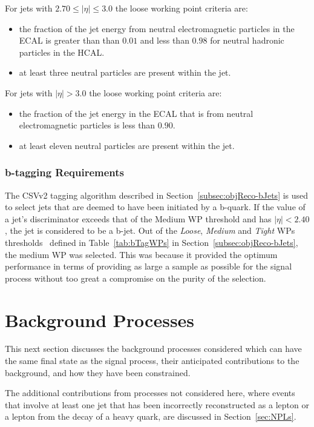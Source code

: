 For jets with $ 2.70 \leq |\eta| \leq 3.0$ the loose working point criteria are:
\begin{itemize}
\item the fraction of the jet energy from neutral electromagnetic particles in the ECAL is greater than than $0.01$ and less than $0.98$ for neutral hadronic particles in the HCAL.
\item at least three neutral particles are present within the jet.
\end{itemize}

For jets with $|\eta| > 3.0$ the loose working point criteria are:
\begin{itemize}
\item the fraction of the jet energy in the ECAL that is from neutral electromagnetic particles is less than $0.90$.
\item at least eleven neutral particles are present within the jet.
\end{itemize}

\subsubsection{b-tagging Requirements}\label{subsubsec:bTag}
The CSVv2 tagging algorithm described in Section~\ref{subsec:objReco-bJets} is used to select jets that are deemed to have been initiated by a b-quark.
If the value of a jet's discriminator exceeds that of the Medium WP threshold and has $|\eta| < 2.40$, the jet is considered to be a b-jet.
Out of the \emph{Loose}, \emph{Medium} and \emph{Tight} WPs thresholds~\cite{Sirunyan:2017ezt} defined in Table~\ref{tab:bTagWPs} in Section~\ref{subsec:objReco-bJets}, the medium WP was selected.
This was because it provided the optimum performance in terms of providing as large a sample as possible for the signal process without too great a compromise on the purity of the selection.

\section{Background Processes}\label{sec:backgroundProcesses}
This next section discusses the background processes considered which can have the same final state as the signal process, their anticipated contributions to the background, and how they have been constrained.

The additional contributions from processes not considered here, where events that involve at least one jet that has been incorrectly reconstructed as a lepton or a lepton from the decay of a heavy quark, are discussed in Section~\ref{sec:NPLs}.

